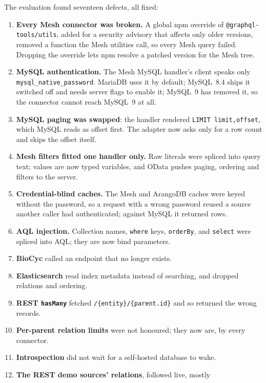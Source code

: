 \documentclass[sigconf,nonacm]{acmart}
\begin{document}
The evaluation found seventeen defects, all fixed:
\begin{enumerate}
  \item \textbf{Every Mesh connector was broken.}  A global npm override
        of \texttt{@graphql-tools/utils}, added for a security advisory
        that affects only older versions, removed a function the Mesh
        utilities call, so every Mesh query failed.  Dropping the
        override lets npm resolve a patched version for the Mesh tree.
  \item \textbf{MySQL authentication.}  The Mesh MySQL handler's client
        speaks only \texttt{mysql\_native\_password}.  MariaDB uses it by
        default; MySQL~8.4 ships it switched off and needs server flags
        to enable it; MySQL~9 has removed it, so the connector cannot
        reach MySQL~9 at all.
  \item \textbf{MySQL paging was swapped}: the handler rendered
        \texttt{LIMIT limit,offset}, which MySQL reads as offset first.
        The adapter now asks only for a row count and skips the offset
        itself.
  \item \textbf{Mesh filters fitted one handler only.}  Raw literals
        were spliced into query text; values are now typed variables,
        and OData pushes paging, ordering and filters to the server.
  \item \textbf{Credential-blind caches.}  The Mesh and ArangoDB caches
        were keyed without the password, so a request with a wrong
        password reused a source another caller had authenticated;
        against MySQL it returned rows.
  \item \textbf{AQL injection.}  Collection names, \texttt{where} keys,
        \texttt{orderBy}, and \texttt{select} were spliced into AQL;
        they are now bind parameters.
  \item \textbf{BioCyc} called an endpoint that no longer exists.
  \item \textbf{Elasticsearch} read index metadata instead of searching,
        and dropped relations and ordering.
  \item \textbf{REST \texttt{hasMany}} fetched
        \texttt{/\{entity\}/\{parent.id\}} and so returned the wrong
        records.
  \item \textbf{Per-parent relation limits} were not honoured; they now
        are, by every connector.
  \item \textbf{Introspection} did not wait for a self-hosted database
        to wake.
  \item \textbf{The REST demo sources' relations}, followed live, mostly

\end{enumerate}
\end{document}
